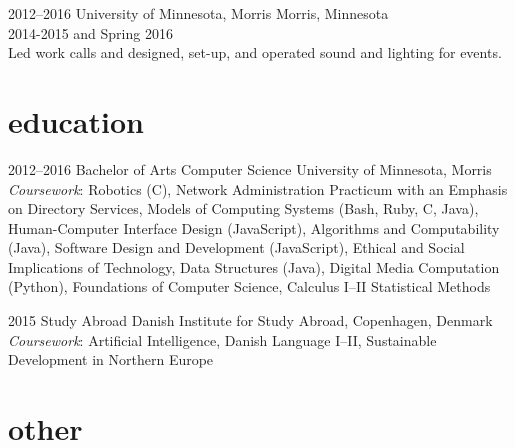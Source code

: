\documentclass[]{cv-style} %
\begin{document}
\begin{entrylist}

\entry
{2012--2016}
{University of Minnesota, Morris}
{Morris, Minnesota}
{ \\
 2014-2015 and Spring 2016 \\
Led work calls and designed, set-­up, and operated sound and lighting for events.}


\end{entrylist}

\vspace{-0.2cm}
\section{education}

\begin{entrylist}


\entry
{2012--2016}
{Bachelor of Arts {\normalfont Computer Science}}
{University of Minnesota, Morris}
{\emph{Coursework}: \footnotesize{Robotics (C), Network Administration Practicum with an Emphasis on Directory Services, Models of Computing Systems (Bash, Ruby, C, Java), Human-Computer Interface Design (JavaScript), Algorithms and Computability (Java), Software Design and Development (JavaScript), Ethical and Social Implications of Technology, Data Structures (Java), Digital Media Computation (Python), Foundations of Computer Science, Calculus I--II Statistical Methods}}

\entry
{2015}
{Study Abroad}
{Danish Institute for Study Abroad, Copenhagen, Denmark}
{\emph{Coursework}: \footnotesize{Artificial Intelligence, Danish Language I--II, Sustainable Development in Northern Europe}}

\end{entrylist}


\section{other}
\end{document}
